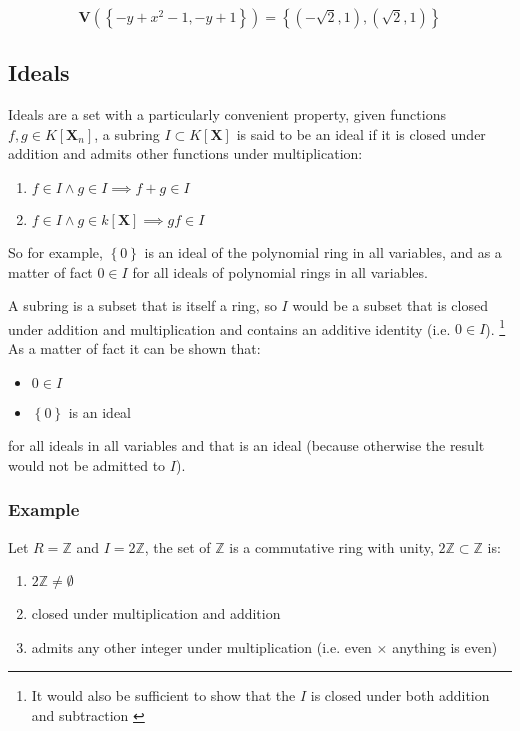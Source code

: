 \documentclass[a4paper,11pt,twoside]{article}
\begin{document}
\[
   \boldsymbol{V}\left(\left\{ -y+x^{2}-1,-y+1\right\}\right)=\left\{ \left(-\sqrt{2},1\right),\left(\sqrt{2},1\right)\right\} 
   \]

\subsection{Ideals}
\label{sec:orgf60e596}
Ideals are a set with a particularly convenient property, given
functions \(f,g\in K\left[\mathbf{X}_n\right]\), a subring
\(I\subset K\left[\textbf{X}\right]\) is said to be an ideal if it
is closed under addition and admits other functions under
multiplication: \cite[\S 1.1.3]{hibiGrobnerBasesStatistics2014}

\begin{enumerate}
\item \(f\in I \land g \in I \implies f+g \in I\)
\item \(f\in I \land g \in k\left[ \textbf{X} \right] \implies gf \in I\)
\end{enumerate}

So for example, \(\left\{0\right\}\) is an ideal of the polynomial ring in
all variables, and as a matter of fact \(0\in I\) for all ideals of
polynomial rings in all variables.

A subring is a subset that is itself a ring, so \(I\) would be a
subset that is closed under addition and multiplication and
contains an additive identity (i.e. \(0 \in I\)). \footnote{It would also be sufficient to show that the \(I\) is closed
under both addition and subtraction \cite[\S 16.1]{judsonAbstractAlgebraTheory2016}} As a
matter of fact it can be shown that:

\begin{itemize}
\item \(0\in I\)
\item \(\left\{0\right\}\) is an ideal
\end{itemize}

for all ideals in all variables and that is an ideal (because
otherwise the result would not be admitted to \(I\)).
\subsubsection{Example}
\label{sec:orgc719b85}

Let \(R = \mathbb{Z}\) and \(I=2\mathbb{Z}\), the set of
\(\mathbb{Z}\) is a commutative ring with unity, \(2\mathbb{Z}
    \subset \mathbb{Z}\) is:

\begin{enumerate}
\item \(2\mathbb{Z} \neq \emptyset\)
\item closed under multiplication and addition
\item admits any other integer under multiplication (i.e. even
\(\times\) anything is even)
\end{enumerate}
\end{document}
